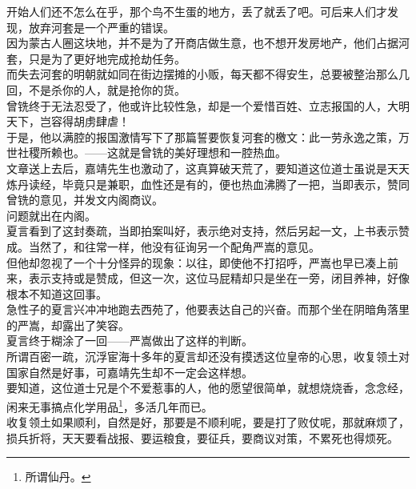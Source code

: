 \begin{multicols}{\theparacolNo}
开始人们还不怎么在乎，那个鸟不生蛋的地方，丢了就丢了吧。可后来人们才发现，放弃河套是一个严重的错误。\\

因为蒙古人圈这块地，并不是为了开商店做生意，也不想开发房地产，他们占据河套，只是为了更好地完成抢劫任务。\\

而失去河套的明朝就如同在街边摆摊的小贩，每天都不得安生，总要被整治那么几回，不是杀你的人，就是抢你的货。\\

曾铣终于无法忍受了，他或许比较性急，却是一个爱惜百姓、立志报国的人，大明天下，岂容得胡虏肆虐！\\

于是，他以满腔的报国激情写下了那篇誓要恢复河套的檄文：此一劳永逸之策，万世社稷所赖也。——这就是曾铣的美好理想和一腔热血。\\

文章送上去后，嘉靖先生也激动了，这真算破天荒了，要知道这位道士虽说是天天炼丹读经，毕竟只是兼职，血性还是有的，便也热血沸腾了一把，当即表示，赞同曾铣的意见，并发文内阁商议。\\

问题就出在内阁。\\

夏言看到了这封奏疏，当即拍案叫好，表示绝对支持，然后另起一文，上书表示赞成。当然了，和往常一样，他没有征询另一个配角严嵩的意见。\\

但他却忽视了一个十分怪异的现象：以往，即使他不打招呼，严嵩也早已凑上前来，表示支持或是赞成，但这一次，这位马屁精却只是坐在一旁，闭目养神，好像根本不知道这回事。\\

急性子的夏言兴冲冲地跑去西苑了，他要表达自己的兴奋。而那个坐在阴暗角落里的严嵩，却露出了笑容。\\

夏言终于糊涂了一回——严嵩做出了这样的判断。\\

所谓百密一疏，沉浮宦海十多年的夏言却还没有摸透这位皇帝的心思，收复领土对国家自然是好事，可嘉靖先生却不一定会这样想。\\

要知道，这位道士兄是个不爱惹事的人，他的愿望很简单，就想烧烧香，念念经，闲来无事搞点化学用品\footnote{所谓仙丹。}，多活几年而已。\\

收复领土如果顺利，自然是好，那要是不顺利呢，要是打了败仗呢，那就麻烦了，损兵折将，天天要看战报、要运粮食，要征兵，要商议对策，不累死也得烦死。\\


\end{multicols}
